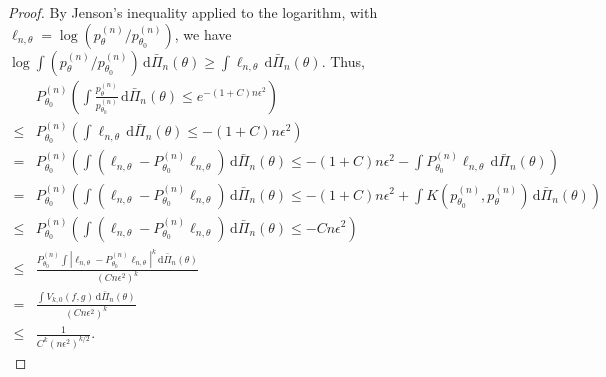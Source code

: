 \documentclass[11pt]{article}
\theoremstyle{plain}
\theoremstyle{definition}
\theoremstyle{remark}
\begin{document}
\begin{proof}
    By Jenson's inequality applied to the logarithm, with $\ell_{n,\theta}=\log\left( p_{\theta}^{(n)}/p_{\theta_0}^{(n)} \right)$,
    we have $\log \int (p_{\theta}^{(n)}/p_{\theta_0}^{(n)}) \, \mathrm d \bar \Pi_n (\theta) \geq \int \ell_{n,\theta} \, \mathrm d \bar \Pi_n (\theta)$.
    Thus,
    \begin{align*}
        &P_{\theta_0}^{(n)} \left( 
            \int 
            \frac{p_{\theta}^{(n)}}{p_{\theta_0}^{(n)}}
            \,\mathrm d \bar \Pi_n (\theta)
            \leq e^{-(1+C)n \epsilon^2} 
        \right)
        \\
        \leq&
        P_{\theta_0}^{(n)} \left( 
            \int 
            \ell_{n,\theta}
            \,\mathrm d \bar \Pi_n (\theta)
            \leq -(1+C)n \epsilon^2
        \right)
        \\
        =&
        P_{\theta_0}^{(n)} \left( 
            \int 
            \left( 
            \ell_{n,\theta}
            - P_{\theta_0}^{(n)} \ell_{n,\theta}
            \right)
            \,\mathrm d \bar \Pi_n (\theta)
            \leq -(1+C)n \epsilon^2
            -
            \int 
             P_{\theta_0}^{(n)} \ell_{n,\theta}
            \,\mathrm d \bar \Pi_n (\theta)
        \right)
        \\
        =&
        P_{\theta_0}^{(n)} \left( 
            \int 
            \left( 
            \ell_{n,\theta}
            - P_{\theta_0}^{(n)} \ell_{n,\theta}
            \right)
            \,\mathrm d \bar \Pi_n (\theta)
            \leq -(1+C)n \epsilon^2
            +
            \int 
            K\left( p_{\theta_0}^{(n)}, p_{\theta}^{(n)} \right)
            \,\mathrm d \bar \Pi_n (\theta)
        \right)
        \\
        \leq&
        P_{\theta_0}^{(n)} \left( 
            \int 
            \left( 
            \ell_{n,\theta}
            - P_{\theta_0}^{(n)} \ell_{n,\theta}
            \right)
            \,\mathrm d \bar \Pi_n (\theta)
            \leq -Cn \epsilon^2
        \right)
        \\
        \leq&
        \frac{
        P_{\theta_0}^{(n)}  
            \int 
            |
            \ell_{n,\theta}
            - P_{\theta_0}^{(n)} \ell_{n,\theta}
            |^k
            \,\mathrm d \bar \Pi_n (\theta)
    }{
        (Cn \epsilon^2)^k
    }
    \\
        =&
        \frac{
            \int 
            V_{k,0}\left( f,g \right)
            \,\mathrm d \bar \Pi_n (\theta)
    }{
        (Cn \epsilon^2)^k
    }
    \\
    \leq&
    \frac{1}{C^k (n\epsilon^2)^{k/2}}.
    \end{align*}
\end{proof}
\end{document}
